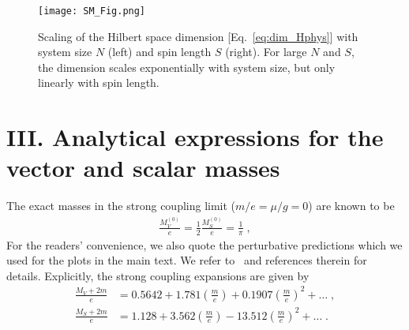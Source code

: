 \documentclass[aps,prl,reprint,twocolumn,superscriptaddress,floatfix,nofootinbib]{revtex4-1}
\begin{document}
\begin{figure}
	{\centering
		\texttt{[image: SM\_Fig.png]}
		\caption{\label{fig:dimension_scaling} Scaling of the Hilbert space dimension [Eq.~\eqref{eq:dim_Hphys}] with system size $N$ (left) and spin length $S$ (right). For large $N$ and $S$, the dimension scales exponentially with system size, but only linearly with spin length.
	}}
\end{figure}


\section{III. Analytical expressions for the vector and scalar masses}
The exact masses in the strong coupling limit ($m/e = \mu/g = 0$) are known to be
\begin{align}
	\frac{M_V^{(0)}}{e} = \frac{1}{2}\frac{M_S^{(0)} }{e}= \frac{1}{\pi} \;,
\end{align}
For the readers' convenience, we also quote the perturbative predictions which we used for the plots in the main text. We refer to~\cite{sriganesh2000new} and references therein for details.
Explicitly, the strong coupling expansions are given by
\begin{align}
	\frac{M_V+2m}{e}  &= 0.5642 + 1.781  \left(\frac{m}{e} \right) + 0.1907  \left(\frac{m}{e} \right)^2 +\dots \;,\\
	\frac{M_S+2m}{e} &= 1.128 + 3.562   \left(\frac{m}{e} \right) - 13.512  \left(\frac{m}{e} \right)^2 +\dots \;.
\end{align}


\end{document}

